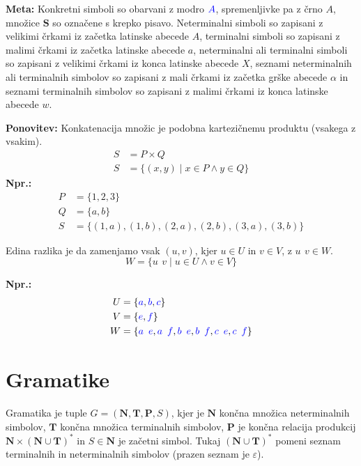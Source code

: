 \documentclass{article}
\newcommand{\Ex}{\textbf{Npr.:}\ }
\newcommand{\Special}[1]{\textbf{#1}}
\newcommand{\Set}[1]{\mathbf{#1}}
\newcommand{\Symbol}[1]{\textcolor{blue}{#1}}
\newcommand{\Grammar}{G}
\newcommand{\Terminals}{\Set{T}}
\newcommand{\NonTerminals}{\Set{N}}
\newcommand{\Productions}{\Set{P}}
\newcommand{\StartSymbol}{S}
\newcommand{\Null}{\varepsilon}
\newcommand{\Seq}{{\ \,}}
\newcommand{\Kleene}[1]{#1^\ast}
\begin{document}
\Special{Meta:} Konkretni simboli so obarvani z modro $\Symbol{A}$, spremenljivke pa z črno $A$, množice $\Set{S}$ so označene s krepko pisavo.
Neterminalni simboli so zapisani z velikimi črkami iz začetka latinske abecede $A$, terminalni simboli so zapisani z malimi črkami iz začetka latinske abecede $a$, neterminalni ali terminalni simboli so zapisani z velikimi črkami iz konca latinske abecede $X$, seznami neterminalnih ali terminalnih simbolov so zapisani z mali črkami iz začetka grške abecede $\alpha$ in seznami terminalnih simbolov so zapisani z malimi črkami iz konca latinske abecede $w$.

\Special{Ponovitev:}
Konkatenacija množic je podobna kartezičnemu produktu (vsakega z vsakim).
\begin{align*}
  S &= P \times Q \\
  S &= \{ (x, y) \mid x \in P \land y \in Q\}
\end{align*}
\Ex
\begin{align*}
  P &= \{1, 2, 3\}\\
  Q &= \{a, b\}\\
  S &= \{(1, a), (1, b), (2, a), (2, b), (3, a), (3, b) \}
\end{align*}

Edina razlika je da zamenjamo vsak $(u, v)$, kjer $u \in U$ in $v\in V$, z $u \Seq v \in W$.
\begin{equation*}
  W = \{ u \Seq v \mid u \in U \land v \in V\}
\end{equation*}

\Ex
\begin{align*}
  U &= \{\Symbol{a}, \Symbol{b}, \Symbol{c}\}\\
  V &= \{\Symbol{e}, \Symbol{f}\}\\
  W &= \{\Symbol{a} \Seq \Symbol{e}, \Symbol{a} \Seq \Symbol{f}, \Symbol{b} \Seq \Symbol{e}, \Symbol{b} \Seq \Symbol{f}, \Symbol{c} \Seq \Symbol{e}, \Symbol{c} \Seq \Symbol{f}\}
\end{align*}

\section{Gramatike}
Gramatika je tuple $\Grammar = (\NonTerminals, \Terminals, \Productions, \StartSymbol)$, kjer je $\NonTerminals$ končna množica neterminalnih simbolov, $\Terminals$ končna množica terminalnih simbolov, $\Productions$ je končna relacija produkcij $\NonTerminals \times \Kleene{(\NonTerminals \cup \Terminals)}$ in $\StartSymbol \in \NonTerminals$ je začetni simbol.
Tukaj $\Kleene{(\NonTerminals \cup \Terminals)}$ pomeni seznam terminalnih in neterminalnih simbolov (prazen seznam je $\Null$).
\end{document}
